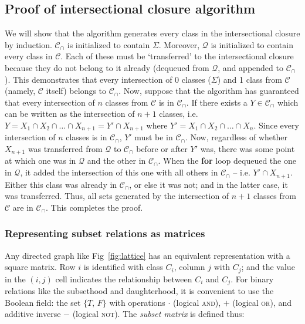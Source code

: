 \documentclass[11pt, oneside]{article}   	%
\begin{document}
\subsection{Proof of intersectional closure algorithm}

We will show that the algorithm generates every class in the intersectional closure by induction. $\mathcal C_\cap$ is initialized to contain $\Sigma$. Moreover, $\mathcal Q$ is initialized to contain every class in $\mathcal C$. Each of these must be `transferred' to the intersectional closure because they do not belong to it already (dequeued from $\mathcal Q$, and appended to $\mathcal C_\cap$). This demonstrates that every intersection of 0 classes ($\Sigma$) and 1 class from $\mathcal C$ (namely, $\mathcal C$ itself) belongs to $\mathcal C_\cap$. Now, suppose that the algorithm has guaranteed that every intersection of $n$ classes from $\mathcal C$ is in $\mathcal C_\cap$. If there exists a $Y \in \mathcal C_\cap$ which can be written as the intersection of $n+1$ classes, i.e. $Y = X_1 \cap X_2 \cap \ldots \cap X_{n+1} = Y' \cap X_{n+1}$ where $Y' = X_1 \cap X_2 \cap \ldots \cap X_n$. Since every intersection of $n$ classes is in $\mathcal C_\cap$, $Y'$ must be in $\mathcal C_\cap$. Now, regardless of whether $X_{n+1}$ was transferred from $\mathcal Q$ to $\mathcal C_\cap$ before or after $Y'$ was, there was some point at which one was in $\mathcal Q$ and the other in $\mathcal C_\cap$. When the \textbf{for} loop dequeued the one in $\mathcal Q$, it added the intersection of this one with all others in $\mathcal C_\cap$ -- i.e. $Y' \cap X_{n+1}$. Either this class was already in $\mathcal C_\cap$, or else it was not; and in the latter case, it was transferred. Thus, all sets generated by the intersection of $n+1$ classes from $\mathcal C$ are in $\mathcal C_\cap$. This completes the proof.



\subsubsection{Representing subset relations as matrices}

\vspace{\baselineskip} Any directed graph like Fig~\ref{fig:lattice} has an equivalent representation with a square matrix. Row $i$ is identified with class $C_i$, column $j$ with $C_j$; and the value in the $(i,j)$ cell indicates the relationship between $C_i$ and $C_j$. For binary relations like the subsethood and daughterhood, it is convenient to use the Boolean field: the set $\{T, \, F\}$ with operations $\cdot$ (logical \textsc{and}), $+$ (logical \textsc{or}), and additive inverse $-$ (logical \textsc{not}). The \textit{subset matrix} is defined thus:
\end{document}
